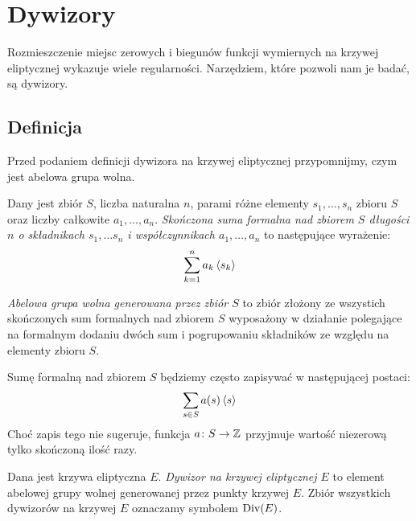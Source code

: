 \section{Dywizory}

\noindent
Rozmieszczenie miejsc zerowych i biegunów
funkcji wymiernych na krzywej eliptycznej
wykazuje wiele regularności.
Narzędziem, które pozwoli nam je badać, są dywizory.

\subsection*{Definicja}

\noindent
Przed podaniem definicji dywizora na krzywej eliptycznej przypomnijmy,
czym jest abelowa grupa wolna.

\begin{definition}
Dany jest zbiór $S$,
liczba naturalna $n$,
parami różne elementy $s_1, \ldots, s_n$ zbioru $S$
oraz liczby całkowite $a_1, \ldots, a_n$.
\emph{Skończona suma formalna nad zbiorem $S$ długości $n$
o składnikach $s_1, \ldots s_n$ i współczynnikach $a_1, \ldots, a_n$}
to następujące wyrażenie:
\begin{equation*}
\sum_{k=1}^n a_k\left\langle s_k\right\rangle
\end{equation*}

\noindent
\emph{Abelowa grupa wolna generowana przez zbiór $S$}
to zbiór złożony ze wszystich skończonych sum formalnych nad zbiorem $S$
wyposażony w działanie polegające na formalnym dodaniu dwóch sum
i pogrupowaniu składników ze względu na elementy zbioru $S$.
\end{definition}

\begin{remark}\label{formal_sum_notation_remark}
Sumę formalną nad zbiorem $S$ będziemy często zapisywać
w następującej postaci:
\begin{equation*}
\sum_{s \in S}a(s)\left\langle s\right\rangle
\end{equation*}
Choć zapis tego nie sugeruje,
funkcja $a \colon S \to \mathbb{Z}$ przyjmuje wartość niezerową
tylko skończoną ilość razy.
\end{remark}

\begin{definition}
Dana jest krzywa eliptyczna $E$.
\emph{Dywizor na krzywej eliptycznej $E$}
to element abelowej grupy wolnej generowanej przez punkty krzywej $E$.
Zbiór wszystkich dywizorów na krzywej $E$ oznaczamy symbolem $\operatorname{Div}(E)$.
\end{definition}

